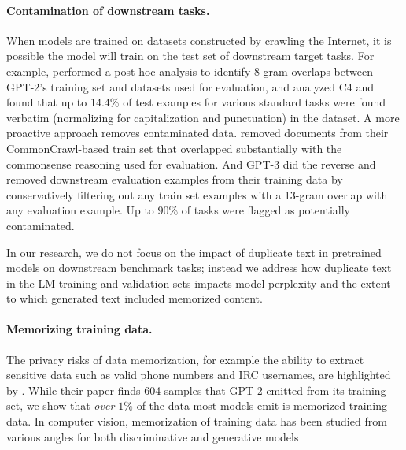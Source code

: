 \paragraph{Contamination of downstream tasks.}
When models are trained on datasets constructed by crawling the Internet, it is possible the model will train on the test set of downstream target tasks.
For example, \citet[\S{}4]{radford2019language} performed a post-hoc analysis to identify 8-gram overlaps between GPT-2's training set and datasets used for evaluation,
and \citet{Dodge2021-lb} analyzed C4 and found that up to 14.4\%  of test examples for various standard tasks were found verbatim (normalizing for capitalization and punctuation) in the dataset.
A more proactive approach removes contaminated data.
\citet[Appendix B]{trinh2018simple} removed documents from their CommonCrawl-based train set that overlapped substantially with the commonsense reasoning used for evaluation.
And GPT-3 \cite[\S{}5]{brown2020language} did the reverse and removed downstream evaluation examples from their training data by conservatively filtering out any train set examples with a 13-gram overlap with any evaluation example.
Up to $90\%$ of tasks were flagged as potentially contaminated.

In our research, we do not focus on the impact of duplicate text in pretrained models on downstream benchmark tasks; instead we address how duplicate text in the LM training and validation sets impacts model perplexity and the extent to which generated text included memorized content.

\paragraph{Memorizing training data.} The privacy risks of data memorization, for example the ability to extract sensitive data such as valid phone numbers and IRC usernames, are highlighted by
\citet{carlini2020extracting}.
%
While their paper finds 604 samples that GPT-2 emitted from its training set, we show that \emph{over $1\%$} of the data most models emit is memorized training data.
% 
In computer vision, memorization of training data has been studied from various angles for both discriminative and generative models~\citep[e.g.][]{arpit2017closer,8953411,feldman2020neural,stephenson2021geometry}

